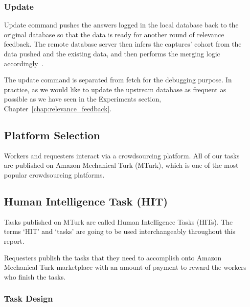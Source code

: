 \subsubsection{Update}

Update command pushes the answers logged in the local database back to the
original database so that the data is ready for another round of relevance
feedback. The remote database server then infers the captures' cohort from the
data pushed and the existing data, and then performs the merging logic
accordingly~\cite{sloopdocs}.

The update command is separated from fetch for the debugging purpose. In
practice, as we would like to update the upstream database as frequent as
possible as we have seen in the Experiments section,
Chapter~\ref{chap:relevance_feedback}.

\subsection{Platform Selection}

Workers and requesters interact via a crowdsourcing platform. All of our tasks
are published on Amazon Mechanical Turk (MTurk), which is one of the most
popular crowdsourcing platforms.

\subsection{Human Intelligence Task (HIT)}

Tasks published on MTurk are called Human
Intelligence Tasks (HITs). The terms `HIT' and `tasks' are going to be used
interchangeably throughout this report.

Requesters publish the tasks that they need to accomplish onto Amazon
Mechanical Turk marketplace with an amount of payment to reward the workers who
finish the tasks.

\subsubsection{Task Design}

